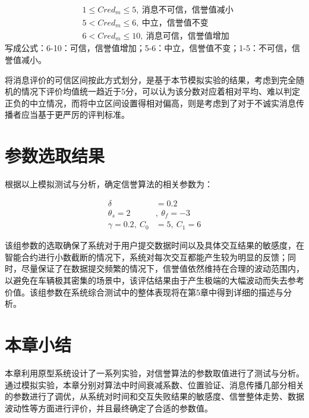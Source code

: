 \begin{equation*}
    \begin{aligned}
        &1\leq Cred_m\leq 5,\ \mbox{消息不可信，信誉值减小} \\
        &5< Cred_m\leq 6,\ \mbox{中立，信誉值不变} \\
        &6< Cred_m\leq 10,\ \mbox{消息可信，信誉值增加}
    \end{aligned}
\end{equation*}
写成公式：6-10：可信，信誉值增加；5-6：中立，信誉值不变；1-5：不可信，信誉值减小。

将消息评价的可信区间按此方式划分，是基于本节模拟实验的结果，考虑到完全随机的情况下评价均值统一趋近于5分，可以认为该分数对应着相对平均、难以判定正负的中立情况，而将中立区间设置得相对偏高，则是考虑到了对于不诚实消息传播者应当基于更严厉的评判标准。

\section{参数选取结果}

根据以上模拟测试与分析，确定信誉算法的相关参数为：

\begin{equation*}
    \begin{aligned}
        \delta&=0.2 \\
        \theta_{s}=2&,\ \theta_{f}=-3 \\
        \gamma=0.2,\ C_0&=5,\ C_1=6
    \end{aligned}
\end{equation*}

该组参数的选取确保了系统对于用户提交数据时间以及具体交互结果的敏感度，在智能合约进行小数截断的情况下，系统对每次交互都能产生较为明显的反馈；同时，尽量保证了在数据提交频繁的情况下，信誉值依然维持在合理的波动范围内，以避免在车辆极其密集的场景中，该评估结果由于产生极端的大幅波动而失去参考价值。该组参数在系统综合测试中的整体表现将在第5章中得到详细的描述与分析。

\section{本章小结}
本章利用原型系统设计了一系列实验，对信誉算法的参数取值进行了测试与分析。通过模拟实验，本章分别对算法中时间衰减系数、位置验证、消息传播几部分相关的参数进行了调优，从系统对时间和交互失败结果的敏感度、信誉整体走势、数据波动性等方面进行评价，并且最终确定了合适的参数值。